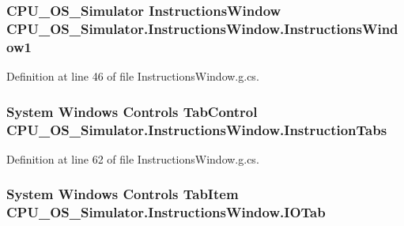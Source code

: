 \subsubsection[{Instructions\+Window1}]{\setlength{\rightskip}{0pt plus 5cm}C\+P\+U\+\_\+\+O\+S\+\_\+\+Simulator {\bf Instructions\+Window} C\+P\+U\+\_\+\+O\+S\+\_\+\+Simulator.\+Instructions\+Window.\+Instructions\+Window1\hspace{0.3cm}{\ttfamily [package]}}\label{class_c_p_u___o_s___simulator_1_1_instructions_window_ab7cd84f5ba064256327f6b1b1cdbc525}


Definition at line 46 of file Instructions\+Window.\+g.\+cs.

\hypertarget{class_c_p_u___o_s___simulator_1_1_instructions_window_a2e3784c64a40e14586270c1ebfe8bf3d}{}
\subsubsection[{Instruction\+Tabs}]{\setlength{\rightskip}{0pt plus 5cm}System Windows Controls Tab\+Control C\+P\+U\+\_\+\+O\+S\+\_\+\+Simulator.\+Instructions\+Window.\+Instruction\+Tabs\hspace{0.3cm}{\ttfamily [package]}}\label{class_c_p_u___o_s___simulator_1_1_instructions_window_a2e3784c64a40e14586270c1ebfe8bf3d}


Definition at line 62 of file Instructions\+Window.\+g.\+cs.

\hypertarget{class_c_p_u___o_s___simulator_1_1_instructions_window_aaf736178464d8313c866ab6efeae19c5}{}
\subsubsection[{I\+O\+Tab}]{\setlength{\rightskip}{0pt plus 5cm}System Windows Controls Tab\+Item C\+P\+U\+\_\+\+O\+S\+\_\+\+Simulator.\+Instructions\+Window.\+I\+O\+Tab\hspace{0.3cm}{\ttfamily [package]}}\label{class_c_p_u___o_s___simulator_1_1_instructions_window_aaf736178464d8313c866ab6efeae19c5}


